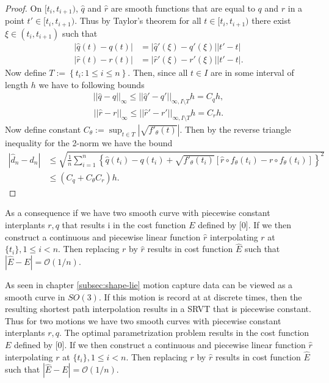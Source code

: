 \begin{proof}
  On  \([t_i, t_{i+1})\),  \(\hat q\) and  \(\hat r\) are smooth functions that are equal to  \(q\) and  \(r\) in a point  \(t' \in [t_i, t_{i+1})\). Thus by Taylor's theorem for all  \(t \in [t_i, t_{i+1})\) there exist  \(\xi \in (t_i, t_{i+1})\) such that
  \begin{eqnarray}
    |\hat q(t) - q(t)|  &= |\hat q'(\xi) - q'(\xi)||t' - t| \\
    |\hat r(t) - r(t)|  &= |\hat r'(\xi) - r'(\xi)||t' - t|.
  \end{eqnarray}
  Now define  \(T:= \left \{t_i : 1 \leq i \leq n \right \} \). Then, since all  \(t \in I\) are in some interval of length  \(h\) we have to following bounds
  \begin{eqnarray}
    ||\hat q - q||_{\infty} \leq ||\hat q' - q'||_{\infty, I \setminus T}h = C_q h,
  \end{eqnarray}
  \begin{eqnarray}
    ||\hat r - r||_{\infty} \leq ||\hat r' - r'||_{\infty, I \setminus T}h = C_r h.
  \end{eqnarray}
  Now define constant  \(C_{\theta}:= \sup_{t\in T} | \sqrt{f'_\theta(t)} | \). Then by the reverse triangle inequality for the 2-norm we have the bound
  \begin{align}
    |\hat d_n - d_n |
     & \leq \sqrt{\frac{1}{n}\sum_{i=1}^{n}\left\{\hat q(t_i) - q(t_i)  + \sqrt{f'_{\theta}(t_i)}\left[  \hat r \circ f_{\theta}(t_i) - r \circ f_{\theta}(t_i)\right]\right\}^2} \\
     & \leq \left(C_q  + C_{\theta} C_r \right)h.
  \end{align}
\end{proof}

As a consequence if we have two smooth curve with piecewise constant interplants \(r, q\) that results i in the cost function \(E\) defined by [0]. If we then construct a continuous and piecewise linear function \(\hat r\) interpolating \(r\) at \(\{t_i\}, 1 \leq i <n\). Then replacing \(r\) by \(\hat r\) results in cost function $\hat{E}$ such that \(|\hat{E} - E |= \mathcal{O}(1/n)\). 

As seen in chapter \ref{subsec:shape-lie} motion capture data can be viewed as a smooth curve in \(SO(3)\). If this motion is record at at discrete times, then the resulting shortest path interpolation results in a SRVT that is piecewise constant. Thus for two motions we have two smooth curves with piecewise constant interplants \(r, q\). The optimal parametrization problem results in the cost function \(E\) defined by [0]. If we then construct a continuous and piecewise linear function \(\hat r\) interpolating \(r\) at \(\{t_i\}, 1 \leq i <n\). Then replacing \(r\) by \(\hat r\) results in cost function $\hat{E}$ such that \(|\hat{E} - E |= \mathcal{O}(1/n)\). 